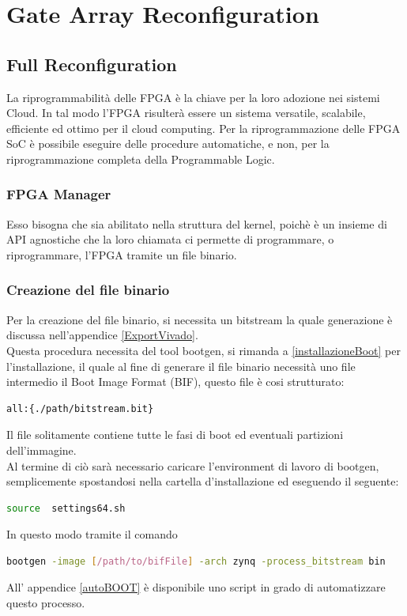 \chapter{Gate Array Reconfiguration}
\label{chap:Cap3}
\section{Full Reconfiguration}
La riprogrammabilità delle FPGA è la chiave per la loro adozione nei sistemi Cloud. In tal modo l'FPGA risulterà essere un sistema versatile, scalabile, efficiente ed ottimo per il cloud computing. Per la riprogrammazione delle FPGA SoC è possibile eseguire delle procedure automatiche, e non, per la riprogrammazione completa della Programmable Logic.

\subsection{FPGA Manager}
Esso bisogna che sia abilitato nella struttura del kernel, poichè è un insieme di API agnostiche che la loro chiamata ci permette di programmare, o riprogrammare, l'FPGA tramite un file binario.
\subsection{Creazione del file binario}
Per la creazione del file binario, si necessita un bitstream la quale generazione è discussa nell'appendice \ref{ExportVivado}.\\
Questa procedura necessita del tool bootgen, si rimanda a \ref{installazioneBoot} per l'installazione, il quale al fine di generare il file binario necessità uno file intermedio il Boot Image Format (BIF), questo file è cosi strutturato:
\begin{lstlisting}[language=sh, label=lst:C, caption={template file .bif}]
all:{./path/bitstream.bit}
\end{lstlisting}
Il file solitamente contiene tutte le fasi di boot ed eventuali partizioni dell'immagine.\\
Al termine di ciò sarà necessario caricare l'environment di lavoro di bootgen, semplicemente spostandosi nella cartella d'installazione ed eseguendo il seguente:
\begin{lstlisting}[language=sh, label=lst:C, caption={setup environment bootgen}]
source  settings64.sh
\end{lstlisting}
In questo modo tramite il comando 
\begin{lstlisting}[language=sh, label=lst:C, caption={setup environment bootgen}]
bootgen -image [/path/to/bifFile] -arch zynq -process_bitstream bin
\end{lstlisting}
All' appendice \ref{autoBOOT} è disponibile uno script in grado di automatizzare questo processo.
